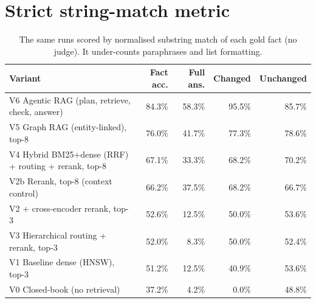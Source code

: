 \documentclass[11pt,a4paper]{article}
\begin{document}
\appendix
\section{Strict string-match metric}
\begin{table}[h]\centering\small
\caption{The same runs scored by normalised substring match of each gold fact (no judge). It under-counts paraphrases and list formatting.}
\begin{tabular}{@{}p{6.1cm}rrrr@{}}\toprule
Variant & Fact acc. & Full ans. & Changed & Unchanged\\\midrule
V6 Agentic RAG (plan, retrieve, check, answer) & 84.3\% & 58.3\% & 95.5\% & 85.7\% \\
V5 Graph RAG (entity-linked), top-8 & 76.0\% & 41.7\% & 77.3\% & 78.6\% \\
V4 Hybrid BM25+dense (RRF) + routing + rerank, top-8 & 67.1\% & 33.3\% & 68.2\% & 70.2\% \\
V2b Rerank, top-8 (context control) & 66.2\% & 37.5\% & 68.2\% & 66.7\% \\
V2 + cross-encoder rerank, top-3 & 52.6\% & 12.5\% & 50.0\% & 53.6\% \\
V3 Hierarchical routing + rerank, top-3 & 52.0\% & 8.3\% & 50.0\% & 52.4\% \\
V1 Baseline dense (HNSW), top-3 & 51.2\% & 12.5\% & 40.9\% & 53.6\% \\
V0 Closed-book (no retrieval) & 37.2\% & 4.2\% & 0.0\% & 48.8\% \\
\bottomrule\end{tabular}
\end{table}
\end{document}
